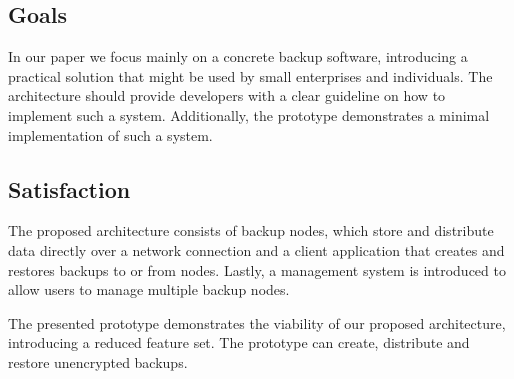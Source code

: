 \subsection{Goals}
In our paper we focus mainly on a concrete backup software, introducing a practical solution that might be used by small enterprises and individuals. The architecture should provide developers with a clear guideline on how to implement such a system. Additionally, the prototype demonstrates a minimal implementation of such a system.

\subsection{Satisfaction}
The proposed architecture consists of backup nodes, which store and distribute data directly over a network connection and a client application that creates and restores backups to or from nodes. Lastly, a management system is introduced to allow users to manage multiple backup nodes.

The presented prototype demonstrates the viability of our proposed architecture, introducing a reduced feature set. The prototype can create, distribute and restore unencrypted backups.
